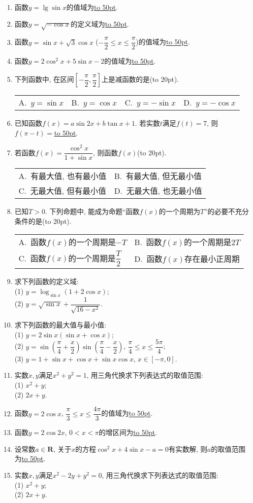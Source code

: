 \documentclass[10pt,a4paper]{article}
\newcommand{\blank}[1]{\underline{\hbox to #1pt{}}}
\newcommand{\bracket}[1]{(\hbox to #1pt{})}
\newcommand{\twoch}[4]{\par\begin{tabular}{p{.46\textwidth}p{.46\textwidth}}
A.~#1& B.~#2\\
C.~#3& D.~#4
\end{tabular}}
\newcommand{\fourch}[4]{\par\begin{tabular}{p{.23\textwidth}p{.23\textwidth}p{.23\textwidth}p{.23\textwidth}}
A.~#1 &B.~#2& C.~#3& D.~#4
\end{tabular}}
\begin{document}
\begin{enumerate}[1.]
\item 函数$y=\lg \sin x$的值域为\blank{50}.
\item 函数$y=\sqrt{-\cos x}$的定义域为\blank{50}.
\item 函数$y=\sin x+\sqrt 3\cos x$ ($-\dfrac{\pi}2\le x\le \dfrac{\pi}2$)的值域为\blank{50}.
\item 函数$y=2\cos^2 x+5\sin x-2$的值域为\blank{50}.
\item 下列函数中, 在区间$[-\dfrac{\pi}2,\dfrac{\pi}2]$上是减函数的是\bracket{20}.
\fourch{$y=\sin x$}{$y=\cos x$}{$y=-\sin x$}{$y=-\cos x$}
\item 已知函数$f(x)=a\sin 2x+b\tan x+1$. 若实数$t$满足$f(t)=7$, 则$f(\pi-t)=$\blank{50}.
\item 若函数$f(x)=\dfrac{\cos^2 x}{1+\sin x}$, 则函数$f(x)$\bracket{20}.
\twoch{有最大值, 也有最小值}{有最大值, 但无最小值}{无最大值, 但有最小值}{无最大值, 也无最小值}
\item 已知$T>0$. 下列命题中, 能成为命题``函数$f(x)$的一个周期为$T$''的必要不充分条件的是\bracket{20}.
\twoch{函数$f(x)$的一个周期是$-T$}{函数$f(x)$的一个周期是$2T$}{函数$f(x)$的一个周期是$\dfrac T2$}{函数$f(x)$存在最小正周期}
\item 求下列函数的定义域:\\
(1) $y=\log_{\sin x}(1+2\cos x)$;\\
(2) $y=\sqrt{\sin x}+\dfrac 1{\sqrt{16-x^2}}$.
\item 求下列函数的最大值与最小值:\\
(1) $y=2\sin x(\sin x+\cos x)$;\\
(2) $y=\sin(\dfrac{\pi}4+\dfrac x2)\sin(\dfrac{\pi}4-\dfrac x2)$, $\dfrac{\pi}4\le x\le \dfrac{5\pi}4$;\\
(3) $y=1+\sin x+\cos x+\sin x\cos x$, $x\in [-\pi,0]$.
\item 实数$x,y$满足$x^2+y^2=1$, 用三角代换求下列表达式的取值范围:\\
(1) $x^2+y$;\\
(2) $2x+y$.
\item 函数$y=2\cos x$, $\dfrac{\pi}3\le x\le \dfrac{4\pi}3$的值域为\blank{50}.
\item 函数$y=2\cos 2x$, $0<x<\pi$的增区间为\blank{50}.
\item 设常数$a\in \mathbf{R}$, 关于$x$的方程$\cos^2 x+4\sin x-a=0$有实数解, 则$a$的取值范围为\blank{50}.
\item 实数$x,y$满足$x^2-2y+y^2=0$, 用三角代换求下列表达式的取值范围:\\
(1) $x^2+y$;\\
(2) $2x+y$.

\end{enumerate}
\end{document}
